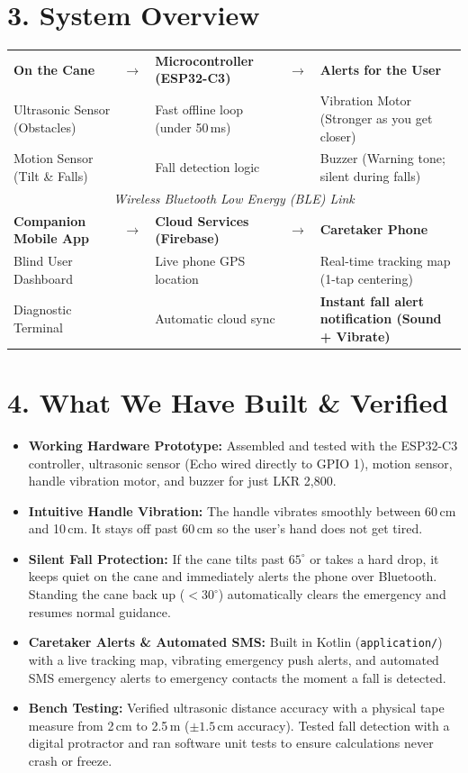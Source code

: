 \documentclass[10pt,a4paper]{article}
\begin{document}
\section{3. System Overview}
\vspace{-0.2em}
\begin{center}
\footnotesize
\begin{tabular}{|l|c|l|c|l|}
\hline
\textbf{On the Cane} & $\rightarrow$ & \textbf{Microcontroller (ESP32-C3)} & $\rightarrow$ & \textbf{Alerts for the User} \\
Ultrasonic Sensor (Obstacles) & & Fast offline loop (under 50\,ms) & & Vibration Motor (Stronger as you get closer) \\
Motion Sensor (Tilt \& Falls) & & Fall detection logic & & Buzzer (Warning tone; silent during falls) \\
\hline
\multicolumn{5}{|c|}{\textit{Wireless Bluetooth Low Energy (BLE) Link}} \\
\hline
\textbf{Companion Mobile App} & $\rightarrow$ & \textbf{Cloud Services (Firebase)} & $\rightarrow$ & \textbf{Caretaker Phone} \\
Blind User Dashboard & & Live phone GPS location & & Real-time tracking map (1-tap centering) \\
Diagnostic Terminal & & Automatic cloud sync & & \textbf{Instant fall alert notification (Sound + Vibrate)} \\
\hline
\end{tabular}
\end{center}
\vspace{-0.4em}

\section{4. What We Have Built \& Verified}
\begin{itemize}
    \item \textbf{Working Hardware Prototype:} Assembled and tested with the ESP32-C3 controller, ultrasonic sensor (Echo wired directly to GPIO 1), motion sensor, handle vibration motor, and buzzer for just LKR 2,800.
    \item \textbf{Intuitive Handle Vibration:} The handle vibrates smoothly between 60\,cm and 10\,cm. It stays off past 60\,cm so the user's hand does not get tired.
    \item \textbf{Silent Fall Protection:} If the cane tilts past $65^\circ$ or takes a hard drop, it keeps quiet on the cane and immediately alerts the phone over Bluetooth. Standing the cane back up ($<30^\circ$) automatically clears the emergency and resumes normal guidance.
    \item \textbf{Caretaker Alerts \& Automated SMS:} Built in Kotlin (\texttt{application/}) with a live tracking map, vibrating emergency push alerts, and automated SMS emergency alerts to emergency contacts the moment a fall is detected.
    \item \textbf{Bench Testing:} Verified ultrasonic distance accuracy with a physical tape measure from 2\,cm to 2.5\,m ($\pm 1.5$\,cm accuracy). Tested fall detection with a digital protractor and ran software unit tests to ensure calculations never crash or freeze.
\end{itemize}
\end{document}
